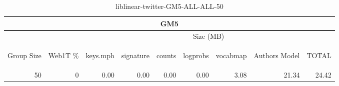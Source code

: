 \begin{center}
\begin{table}[htbp]
\begin{tabular}{ | r | r | r | r | r | r | r | r | r |}
\hline
\multicolumn{9}{|c|}{GM5}\\
\hline
 & & \multicolumn{7}{|c|}{Size (MB)}\\ \cline{3-9}
\begin{sideways}Group Size\end{sideways} & \begin{sideways}Web1T \% \end{sideways} & \begin{sideways}keys.mph\end{sideways} & \begin{sideways}signature\end{sideways} & \begin{sideways}counts\end{sideways} & \begin{sideways}logprobs\end{sideways} & \begin{sideways}vocabmap\end{sideways} & \begin{sideways}Authors Model \end{sideways} & \begin{sideways}TOTAL\end{sideways}\\
\hline
\multirow{0}{*}{50}
 & 0 & 0.00 & 0.00 & 0.00 & 0.00 & 3.08 & 21.34 & 24.42\\ \cline{2-9}
\hline
\end{tabular}
\caption{liblinear-twitter-GM5-ALL-ALL-50}
\label{table:liblinear-twitter-GM5-ALL-ALL-50}
\end{table}
\end{center}

